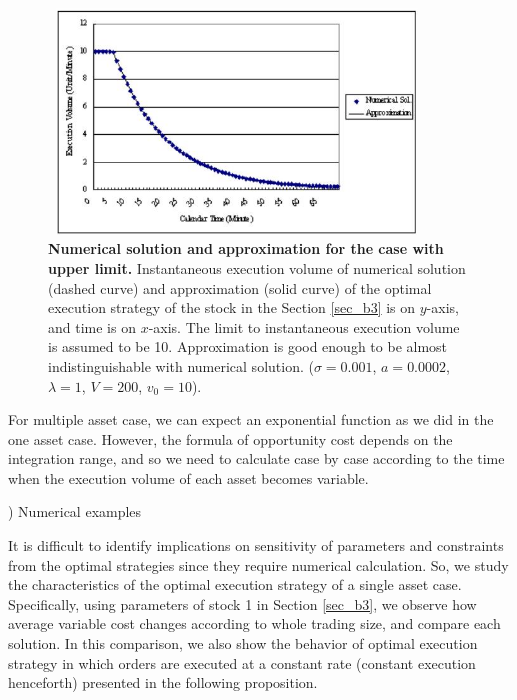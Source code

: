 \begin{figure}[htbp]
\begin{center}
 \includegraphics[width=10cm,height=6cm]{fg_b2n.png}
\end{center}
\caption[Numerical solution and approximation for the case with upper limit]{{\bf Numerical solution and approximation for the case with upper limit.}
 \quad Instantaneous execution volume of numerical solution (dashed curve) and approximation (solid curve)
of the optimal execution strategy of the stock in the Section \ref{sec_b3} is on $y$-axis, and time is on $x$-axis.
 The limit to instantaneous execution volume is assumed to be 10.  Approximation is good enough to be
almost indistinguishable with numerical solution.  ($\sigma=0.001$, $a=0.0002$, $\lambda=1$, $V=200$,
$v_0=10$).}\label{fg_b2}
\end{figure}

 For multiple asset case, we can expect an exponential function as we did in the one asset case.  However, the formula of opportunity cost depends on the integration range, and so we need to calculate case by case according to the time when the execution volume of each asset becomes variable.

\bigskip

) Numerical examples

 It is difficult to identify implications on sensitivity of parameters and constraints from the optimal strategies since they require numerical calculation.  So, we study the characteristics of the optimal execution strategy of a single asset case.  Specifically, using parameters of stock 1 in Section \ref{sec_b3}, we observe how average variable cost changes according to whole trading size, and compare each solution.  In this comparison, we also show the behavior of optimal execution strategy in which orders are executed at a constant rate (constant execution henceforth) presented in the following proposition.

